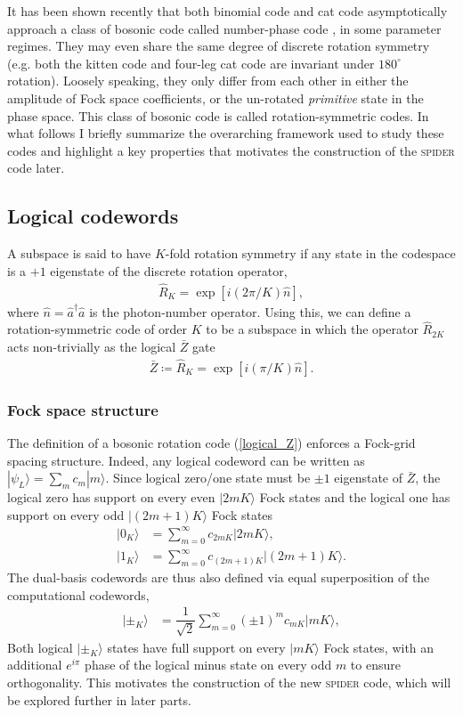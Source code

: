 \documentclass[%
 reprint,
superscriptaddress,
 amsmath,amssymb,
 aps,13pt
]{revtex4-2}
\begin{document}
It has been shown recently that both binomial code and cat code asymptotically approach a class of bosonic code called number-phase code \cite{rotation_symmetric}, in some parameter regimes. They may even share the same degree of discrete rotation symmetry (e.g. both the kitten code and four-leg cat code are invariant under $180^\circ$ rotation). Loosely speaking, they only differ from each other in either the amplitude of Fock space coefficients, or the un-rotated \textit{primitive} state in the phase space. This class of bosonic code is called rotation-symmetric codes. In what follows I briefly summarize the overarching framework used to study these codes and highlight a key properties that motivates the construction of the \textsc{spider} code later.
\subsection{Logical codewords}
A subspace is said to have $K$-fold rotation symmetry if any state in the codespace is a $+1$ eigenstate of the discrete rotation operator,
\begin{align}
    \hat{R}_K = \exp\left[i({2\pi}/{K})\hat{n}\right], 
\end{align}
where $\hat{n}=\hat{a}^\dagger\hat{a}$ is the photon-number operator. Using this, we can define a rotation-symmetric code of order $K$ to be a subspace in which the operator $\hat{R}_{2K}$ acts non-trivially as the logical $\bar{Z}$ gate
\begin{align}\label{logical_Z}
    \bar{Z} \coloneqq \hat{R}_K = \exp\left[i({\pi}/{K})\hat{n}\right].
\end{align}
\subsubsection{Fock space structure}
The definition of a bosonic rotation code (\ref{logical_Z}) enforces a Fock-grid spacing structure. Indeed, any logical codeword can be written as $|\psi_L\rangle = \sum_{m}c_m|m\rangle$. Since logical zero/one state must be $\pm 1$ eigenstate of $\bar{Z}$, the logical zero has support on every even $|2mK\rangle$ Fock states and the logical one has support on every odd $|(2m+1)K\rangle$ Fock states
\begin{align}
    |0_K\rangle &= \sum_{m=0}^\infty c_{2mK}|2mK\rangle,\\
    |1_K\rangle &= \sum_{m=0}^\infty c_{(2m+1)K}|(2m+1)K\rangle.
\end{align}
The dual-basis codewords are thus also defined via equal superposition of the computational codewords,
\begin{align}
    |\pm_K\rangle &= \dfrac{1}{\sqrt{2}}\sum_{m=0}^\infty  (\pm 1)^{m}c_{mK} |mK\rangle,
\end{align}
Both logical $|\pm_K\rangle$ states have full support on every $|mK\rangle$ Fock states, with an additional $e^{i\pi}$ phase of the logical minus state on every odd $m$ to ensure orthogonality. This motivates the construction of the new \textsc{spider} code, which will be explored further in later parts.
\end{document}
